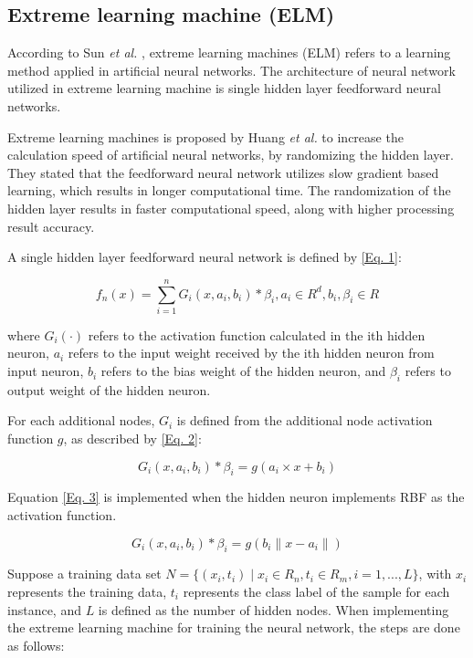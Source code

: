 \documentclass{ws-ijait}
\begin{document}
\subsection{Extreme learning machine (ELM)}

According to Sun \textit{et al.}\cite{21} , extreme learning machines (ELM) refers to a learning method applied in artificial neural networks. The architecture of neural network utilized in extreme learning machine is single hidden layer feedforward neural networks.

Extreme learning machines is proposed by Huang \textit{et al.}\cite{12} to increase the calculation speed of artificial neural networks, by randomizing the hidden layer. They stated that the feedforward neural network utilizes slow gradient based learning, which results in longer computational time. The randomization of the hidden layer results in faster computational speed, along with higher processing result accuracy.

A single hidden layer feedforward neural network is defined by \eqref{Eq. 1}:

\begin{equation}
f_{n} (x) = \sum_{i=1}^{n} G_{i} (x, a_{i}, b_{i}) * \beta_{i}, a_{i} \in R^d, b_{i}, \beta_{i} \in R\label{Eq. 1}
\end{equation}

where $G_{i}(\cdot)$ refers to the activation function calculated in the ith hidden neuron, $a_{i}$ refers to the input weight received by the ith hidden neuron from input neuron, $b_{i}$ refers to the bias weight of the hidden neuron, and $\beta_{i}$ refers to output weight of the hidden neuron.

For each additional nodes, $G_{i}$ is defined from the additional node activation function $g$, as described by \eqref{Eq. 2}:

\begin{equation}
G_{i} (x, a_{i}, b_{i}) * \beta_{i} = g(a_{i} \times x + b_{i})\label{Eq. 2}
\end{equation}

Equation \eqref{Eq. 3} is implemented when the hidden neuron implements RBF as the activation function.

\begin{equation}
G_{i}(x, a_{i}, b_{i}) * \beta_{i} = g(b_{i}\parallel x - a_{i} \parallel)\label{Eq. 3}
\end{equation}

Suppose a training data set $ N = \{(x_{i},t_{i}) \mid x_{i} \in R_{n}, t_{i} \in R_{m}, i = 1, ..., L\}$, with $x_{i}$ represents the training data, $t_{i}$ represents the class label of the sample for each instance, and $L$ is defined as the number of hidden nodes. When implementing the extreme learning machine for training the neural network, the steps are done as follows:
\end{document}
